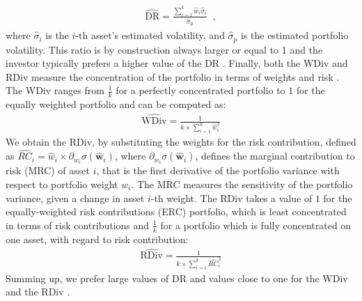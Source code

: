 \documentclass[12pt, a4paper]{article}
\newcommand{\bfw}{\boldsymbol{w} }
\begin{document}
\begin{gather}\label{DR}
\widehat{\text{DR}}=\frac{\sum_{i=1}^{k} \hat{w}_{i} \hat{\sigma}_{i}}{\hat{\sigma}_{p}}\;\;,
\end{gather}
where $\hat{\sigma}_{i}$ is the $i$-th asset's estimated volatility, and $\hat{\sigma}_{p}$ is the estimated portfolio volatility. This ratio is by construction always larger or equal to 1 and the investor typically prefers a higher value of the DR \citep{Choueifaty2008}.
Finally, both the WDiv and RDiv measure the concentration of the portfolio in terms of weights and risk \citep{Maillard2010, Roncalli2013}. The WDiv ranges from $\frac{1}{k}$ for a perfectly concentrated portfolio to $1$ for the equally weighted portfolio and can be computed as:
\begin{gather}
\widehat{\text{WDiv}}= \frac{1}{k \times \sum_{i=1}^{k} {\hat{w}_{i}^{2}}}
\end{gather}
We obtain the RDiv, by substituting the weights for the risk contribution, defined as $\widehat{RC}_{i} = \hat{w}_{i} \times \partial_{w_{i}}\sigma(\hat{\bfw}_{i})$, where $\partial_{w_{i}}\sigma(\hat{\bfw}_{i})$, defines the marginal contribution to risk (MRC) of asset $i$, that is the first derivative of the portfolio variance with respect to portfolio weight $w_{i}$. The MRC measures the sensitivity of the portfolio variance, given a change in asset $i$-th weight. The RDiv takes a value of $1$ for the equally-weighted risk contributions (ERC) portfolio, which is least concentrated in terms of risk contributions and $\frac{1}{k}$ for a portfolio which is fully concentrated on one asset, with regard to risk contribution:
\begin{gather}
\widehat{\text{RDiv}}=\frac{1}{k \times \sum_{i=1}^{k}{\widehat{RC}_{i}^{2}}}
\end{gather}
Summing up, we prefer large values of DR and values close to one for the WDiv and the RDiv \citep{Cazalet2014}.
\end{document}

